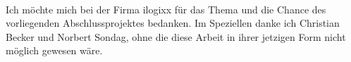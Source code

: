 \preface

\paragraph*{}
Ich möchte mich bei der Firma ilogixx für das Thema und die Chance des vorliegenden Abschlussprojektes bedanken. Im Speziellen danke ich Christian Becker und Norbert Sondag, ohne die diese Arbeit in ihrer jetzigen Form nicht möglich gewesen wäre.